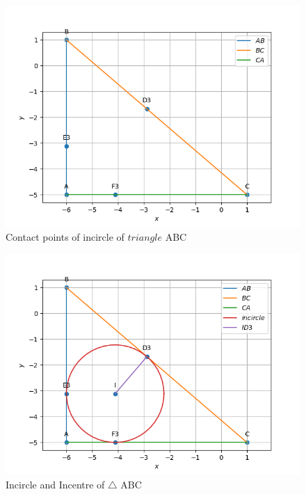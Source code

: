 \documentclass[11pt]{book}
\begin{document}
\begin{enumerate}[label=\thesubsection.\arabic*.,ref=\thesubsection.\theenumi]
\begin{figure}[H]
    \centering
    \includegraphics{figs/Points.png}
    \caption{Contact points of incircle of $triangle$ ABC}
    \label{fig:mat_ang1}
\end{figure}
\begin{figure}[H]
    \centering
    \includegraphics{figs/incircle.png}
    \caption{Incircle and Incentre of $\triangle$ ABC }
    \label{fig:mat_ang2}
\end{figure}
\end{enumerate}
\end{document}
